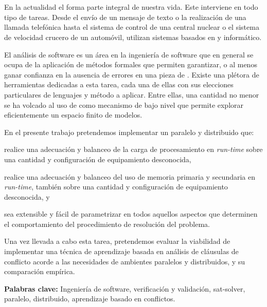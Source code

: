 
\chapter*{\runtitulo}

En la actualidad el \soft forma parte integral de nuestra vida. Este
interviene  en todo tipo de tareas. Desde el envío de un mensaje de texto o la
realización de una llamada telefónica hasta el sistema de control de una
central nuclear o el sistema de velocidad crucero de un automóvil, utilizan
sistemas basados en \hard y \soft informático.

El análisis de software es un área en la ingeniería de software que en general
se ocupa de la aplicación de métodos formales que permiten garantizar, o al
menos ganar confianza en la ausencia de errores en una pieza de \soft. Existe
una plétora de herramientas dedicadas a esta tarea, cada una de ellas con sus
elecciones particulares de lenguajes y método a aplicar. Entre ellas, una
cantidad no menor se ha volcado al uso de \ssolvers \ots como mecanismo de
bajo nivel que permite explorar eficientemente un espacio finito de modelos.

En el presente trabajo pretendemos implementar un \ssolver paralelo y
distribuido que: \begin{inparaenum}[a)]   \item realice una adecuación y
balanceo de la carga de procesamiento en \emph{run-time} sobre una cantidad y
configuración de equipamiento desconocida, \item realice una adecuación y
balanceo del uso de memoria primaria y secundaria en \emph{run-time}, también
sobre una cantidad y configuración de equipamiento desconocida, y  \item sea
extensible y fácil de parametrizar en todos aquellos aspectos que determinen
el comportamiento del procedimiento de resolución del problema.
\end{inparaenum} Una vez llevada a cabo esta tarea, pretendemos evaluar la
viabilidad de implementar una técnica de aprendizaje basada en análisis de
cláusulas de conflicto acorde a las necesidades de ambientes paralelos y
distribuidos, y su comparación empírica.

\bigskip

\noindent \textbf{Palabras clave:} Ingeniería de software, verificación y
validación, sat-solver, paralelo, distribuido, aprendizaje basado en
conflictos.
